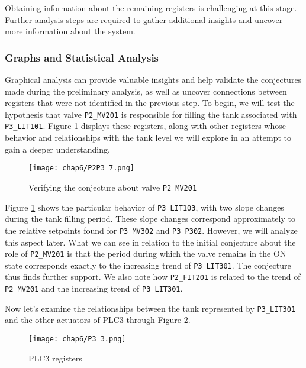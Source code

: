 \bigskip
Obtaining information about the remaining registers is challenging at this stage. Further analysis steps are required to gather additional insights and uncover more information about the system.

\subsubsection{Graphs and Statistical Analysis}
\label{subsubsec:6_P2P3_graphs}
Graphical analysis can provide valuable insights and help validate the conjectures made during the preliminary analysis, as well as uncover connections between registers that were not identified in the previous step. To begin, we will test the hypothesis that valve \texttt{P2\_MV201} is responsible for filling the tank associated with \texttt{P3\_LIT101}. Figure \ref{fig:6_graphs_P2P3_mv201} displays these registers, along with other registers whose behavior and relationships with the tank level we will explore in an attempt to gain a deeper understanding.

\begin{figure}[ht]
	\centering
	\texttt{[image: chap6/P2P3\_7.png]}
	\caption{Verifying the conjecture about valve \texttt{P2\_MV201} }
	\label{fig:6_graphs_P2P3_mv201}
\end{figure}

\bigskip
Figure \ref{fig:6_graphs_P2P3_mv201} shows the particular behavior of \texttt{P3\_LIT103}, with two slope changes during the tank filling period. These slope changes correspond approximately to the relative setpoints found for \texttt{P3\_MV302} and \texttt{P3\_P302}. However, we will analyze this aspect later.
What we can see in relation to the initial conjecture about the role of \texttt{P2\_MV201} is that the period during which the valve remains in the ON state corresponds exactly to the increasing trend of \texttt{P3\_LIT301}. The conjecture thus finds further support. We also note how \texttt{P2\_FIT201} is related to the trend of \texttt{P2\_MV201} and the increasing trend of \texttt{P3\_LIT301}. 

\bigskip
Now let's examine the relationships between the tank represented by \texttt{P3\_LIT301} and the other actuators of PLC3 through Figure \ref{fig:6_graphs_P3}.

\begin{figure}[ht]
	\centering
	\texttt{[image: chap6/P3\_3.png]}
	\caption{PLC3 registers}
	\label{fig:6_graphs_P3}
\end{figure}


